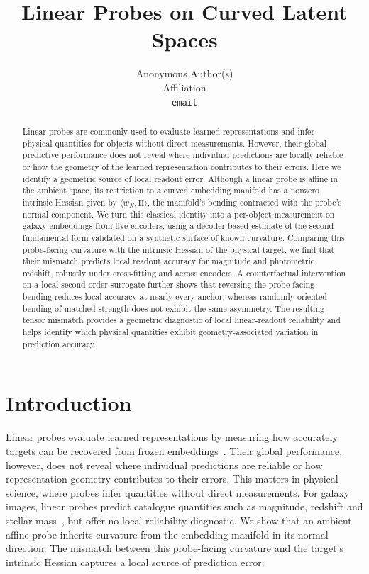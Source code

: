 \documentclass{article}
\title{Linear Probes on Curved Latent Spaces}
\author{%
  Anonymous Author(s)\\
  Affiliation\\
  \texttt{email}
}
\begin{document}
\maketitle

\begin{abstract}
Linear probes are commonly used to evaluate learned representations and infer physical quantities for objects without direct measurements. However, their global predictive performance does not reveal where individual predictions are locally reliable or how the geometry of the learned representation contributes to their errors. Here we identify a geometric source of local readout error. Although a linear probe is affine in the ambient space, its restriction to a curved embedding manifold has a nonzero intrinsic Hessian given by $\langle w_N,\mathrm{II}\rangle$, the manifold's bending contracted with the probe's normal component. We turn this classical identity into a per-object measurement on galaxy embeddings from five encoders, using a decoder-based estimate of the second fundamental form validated on a synthetic surface of known curvature. Comparing this probe-facing curvature with the intrinsic Hessian of the physical target, we find that their mismatch predicts local readout accuracy for magnitude and photometric redshift, robustly under cross-fitting and across encoders. A counterfactual intervention on a local second-order surrogate further shows that reversing the probe-facing bending reduces local accuracy at nearly every anchor, whereas randomly oriented bending of matched strength does not exhibit the same asymmetry. The resulting tensor mismatch provides a geometric diagnostic of local linear-readout reliability and helps identify which physical quantities exhibit geometry-associated variation in prediction accuracy.
\end{abstract}

\section{Introduction}

Linear probes evaluate learned representations by measuring how accurately targets can be recovered from frozen embeddings~\citep{alain2017probes}. Their global performance, however, does not reveal where individual predictions are reliable or how representation geometry contributes to their errors. This matters in physical science, where probes infer quantities without direct measurements. For galaxy images, linear probes predict catalogue quantities such as magnitude, redshift and stellar mass~\citep{smith2024astropt}, but offer no local reliability diagnostic. We show that an ambient affine probe inherits curvature from the embedding manifold in its normal direction. The mismatch between this probe-facing curvature and the target's intrinsic Hessian captures a local source of prediction error.
\end{document}
